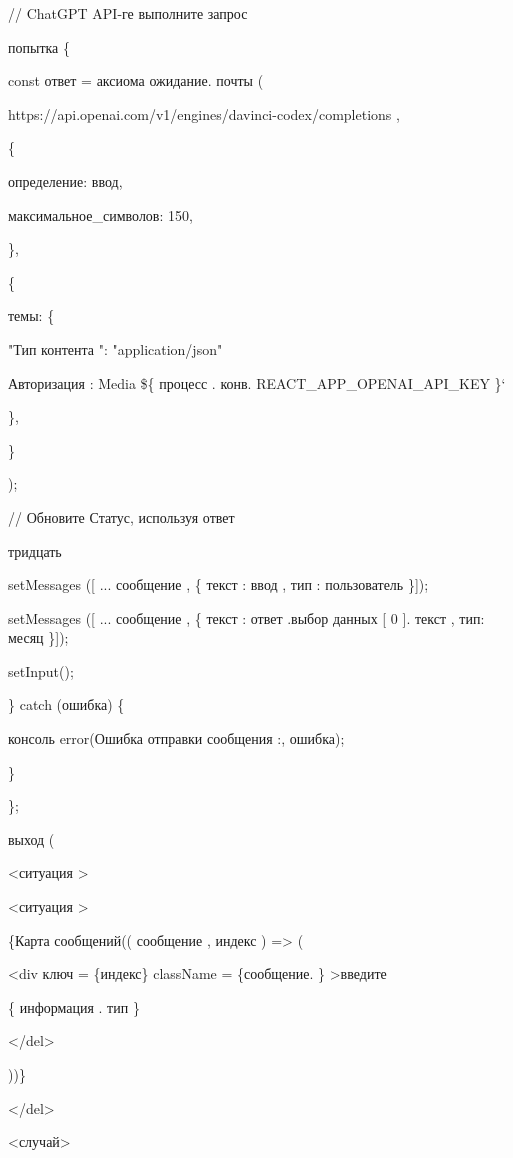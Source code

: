 // ChatGPT API-ге выполните запрос

попытка \{

const ответ = аксиома ожидание. почты (

\textquotesingle https://api.openai.com/v1/engines/davinci-codex/completions\textquotesingle{}
,

\{

определение: ввод,

максимальное\_символов: 150,

\},

\{

темы: \{

"Тип контента ": "application/json"

\textquotesingle Авторизация\textquotesingle{} : \textquotesingle Media
\$\{ процесс . конв. REACT\_APP\_OPENAI\_API\_KEY \}`

\},

\}

);

// Обновите Статус, используя ответ

тридцать

setMessages ({[} ... сообщение , \{ текст : ввод , тип :
\textquotesingle пользователь\textquotesingle{} \}{]});

setMessages ({[} ... сообщение , \{ текст : ответ .выбор данных {[} 0
{]}. текст , тип: \textquotesingle месяц\textquotesingle{} \}{]});

setInput(\textquotesingle\textquotesingle);

\} catch (ошибка) \{

консоль error(\textquotesingle\textquotesingle Ошибка отправки сообщения
:\textquotesingle, ошибка);

\}

\};

выход (

\textless ситуация \textgreater{}

\textless ситуация \textgreater{}

\{Карта сообщений(( сообщение , индекс ) =\textgreater{} (

\textless div ключ = \{индекс\} className = \{сообщение. \}
\textgreater введите

\{ информация . тип \}

\textless/del\textgreater{}

))\}

\textless/del\textgreater{}

\textless случай\textgreater{}

